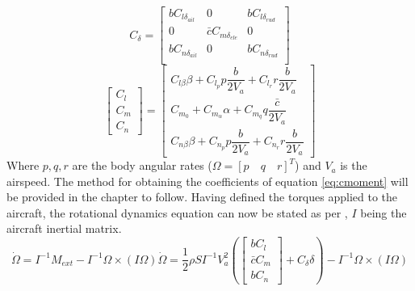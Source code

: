 \begin{equation}
C_\delta = 
\begin{bmatrix}
bC_{l\delta_{ail}} & 0 & bC_{l\delta_{rud}} \\
0 & \bar{c}C_{m\delta_{ele}} & 0 \\
bC_{n\delta_{ail}} & 0 & bC_{n\delta_{rud}}\\
\end{bmatrix}
\label{eq:cdelta}
\end{equation}
\begin{equation}
\begin{bmatrix}
C_l\\
C_m\\
C_n
\end{bmatrix} 
=
\begin{bmatrix}
C_{l\beta} \beta + C_{l_p} p \dfrac{b}{2V_a} + C_{l_r} r \dfrac{b}{2V_a}\\
C_{m_0} + C_{m_\alpha} \alpha + C_{m_q} q \dfrac{\bar{c}}{2V_a}\\
C_{n\beta} \beta + C_{n_p} p \dfrac{b}{2V_a} + C_{n_r} r \dfrac{b}{2V_a}
\end{bmatrix}
\label{eq:cmoment}
\end{equation}
Where $p, q, r$ are the body angular rates ($\Omega = [p\quad q\quad  r]^T$) and $V_a$ is the airspeed. The method for obtaining the coefficients of equation \ref{eq:cmoment} will be provided in the chapter to follow. Having defined the torques applied to the aircraft, the rotational dynamics equation can now be stated as per \cite{hector}, $I$ being the aircraft inertial matrix.
\begin{subequations}
	\begin{equation}
		\dot{\Omega} = I^{-1} M_{ext} - I^{-1}\Omega \times (I\Omega)
	\end{equation}
	\begin{equation}
		\dot{\Omega} = 
		\dfrac{1}{2}\rho S I^{-1} V_a^2\left(
		\begin{bmatrix}
			bC_l\\
			\bar{c}C_m\\
			bC_n
		\end{bmatrix}
		+ C_\delta \delta\right)
		- I^{-1}\Omega \times (I\Omega)	
	\end{equation}

\label{eq:fast_dynamics}
\end{subequations}

